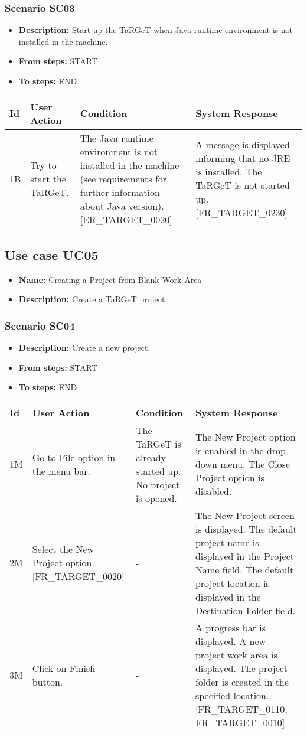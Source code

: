 \documentclass[a4paper,11pt]{article}
\newcommand{\bl}{\\ \hline}
\begin{document}
\subsubsection*{Scenario SC03}
\begin{itemize}
\item {\bf Description:} Start up the TaRGeT when Java runtime environment is
					not installed in the machine.
\item {\bf From steps:} START
\item {\bf To steps:} END
\end{itemize}
\begin{tabular}{|p{0.4in}|p{1.5in}|p{1.5in}|p{1.5in}|}
\hline
Id & User Action & Condition & System Response \bl 
1B & Try to start the TaRGeT. & The Java runtime environment is not installed in the
						machine (see requirements for further information about Java
						version). [ER_TARGET_0020] & A message is displayed informing that no JRE is
						installed. The TaRGeT is not started up. [FR_TARGET_0230]
					\bl
\end{tabular}
\subsection*{Use case UC05}
\begin{itemize}
\item {\bf Name: }Creating a Project from Blank Work Area
\item {\bf Description: }Create a TaRGeT project.
\end{itemize}
\subsubsection*{Scenario SC04}
\begin{itemize}
\item {\bf Description:} Create a new project.
\item {\bf From steps:} START
\item {\bf To steps:} END
\end{itemize}
\begin{tabular}{|p{0.4in}|p{1.5in}|p{1.5in}|p{1.5in}|}
\hline
Id & User Action & Condition & System Response \bl 
1M & Go to File option in the menu bar. & The TaRGeT is already started up. No project is opened.
					 & The New Project option is enabled in the drop down
						menu.
						The Close Project option is disabled.\bl
2M & Select the New Project option. [FR_TARGET_0020] & - & The New Project screen is displayed. The default
						project
						name is displayed in the Project Name field. The default
						project
						location is displayed in the Destination Folder field.
					\bl
3M & Click on Finish button. & - & A progress bar is displayed. A new project work area is
						displayed. The project folder is created in the specified
						location. [FR_TARGET_0110, FR_TARGET_0010]\bl
\end{tabular}
\end{document}
